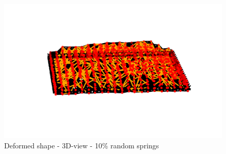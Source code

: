 \begin{figure}[!htbp]
\begin{minipage}{0.3\textwidth}
    \label{fig:rand_10_yz}
\end{minipage}
\hspace{5mm}
\begin{minipage}{0.3\textwidth}
    \centering
    \includegraphics[width = 1\textwidth]{Figures/rand_10_3D.png}
    \caption{Deformed shape - 3D-view - 10\% random springs}
    \label{fig:rand_10_3d}
\end{minipage}
\end{figure}


